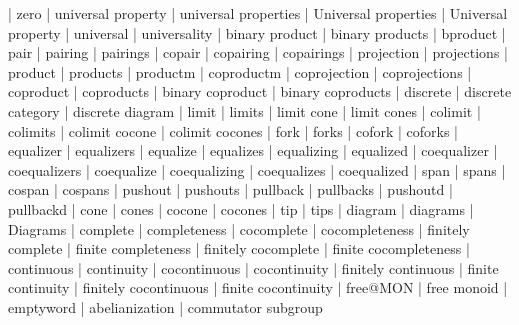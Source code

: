     |   zero
    |   universal property
    |   universal properties
    |   Universal properties
    |   Universal property
    |   universal
    |   universality
    |   binary product
    |   binary products
    |   bproduct
    |   pair
    |   pairing
    |   pairings
    |   copair
    |   copairing
    |   copairings
    |   projection
    |   projections
    |   product
    |   products
    |   productm
    |   coproductm
    |   coprojection
    |   coprojections
    |   coproduct
    |   coproducts
    |   binary coproduct
    |   binary coproducts
    |   discrete
    |   discrete category
    |   discrete diagram
    |   limit
    |   limits
    |   limit cone
    |   limit cones
    |   colimit
    |   colimits
    |   colimit cocone
    |   colimit cocones
    |   fork
    |   forks
    |   cofork
    |   coforks
    |   equalizer
    |   equalizers
    |   equalize
    |   equalizes
    |   equalizing
    |   equalized
    |   coequalizer
    |   coequalizers
    |   coequalize
    |   coequalizing
    |   coequalizes
    |   coequalized
    |   span
    |   spans
    |   cospan
    |   cospans
    |   pushout
    |   pushouts
    |   pullback
    |   pullbacks
    |   pushoutd
    |   pullbackd
    |   cone
    |   cones
    |   cocone
    |   cocones
    |   tip
    |   tips
    |   diagram
    |   diagrams
    |   Diagrams
    |   complete
    |   completeness
    |   cocomplete
    |   cocompleteness
    |   finitely complete
    |   finite completeness
    |   finitely cocomplete
    |   finite cocompleteness
    |   continuous
    |   continuity
    |   cocontinuous
    |   cocontinuity
    |   finitely continuous
    |   finite continuity
    |   finitely cocontinuous
    |   finite cocontinuity
    |   free@MON
    |   free monoid
    |   emptyword
    |   abelianization
    |   commutator subgroup
